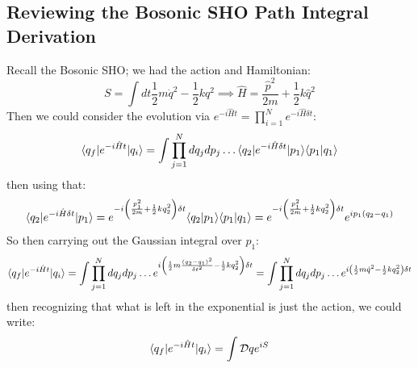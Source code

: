 \subsection{Reviewing the Bosonic SHO Path Integral Derivation}
Recall the Bosonic SHO; we had the action and Hamiltonian:
\begin{equation}
    S = \int dt \frac{1}{2}m\dot{q}^2 - \frac{1}{2}kq^2 \implies \hat{H} = \frac{\hat{p}^2}{2m} + \frac{1}{2}k\hat{q}^2
\end{equation}
Then we could consider the evolution via $e^{-i\hat{H}t} = \prod_{i=1}^N e^{-i\hat{H}\delta t}$:
\begin{equation}
    \langle q_f \rvert e^{-i\hat{H}t}\lvert q_i \rangle = \int \prod_{j=1}^N dq_j dp_j \ldots \langle q_2 \rvert e^{-i\hat{H}\delta t}\lvert p_1 \rangle\langle p_1 \lvert q_1 \rangle
\end{equation}
then using that:
\begin{equation}
    \langle q_2 \rvert e^{-i\hat{H}\delta t}\lvert p_1 \rangle = e^{-i\left(\frac{p_1^2}{2m} + \frac{1}{2}kq_2^2\right)\delta t}\langle q_2 \lvert p_1 \rangle\langle p_1 \lvert q_1 \rangle = e^{-i\left(\frac{p_1^2}{2m} + \frac{1}{2}kq_2^2\right)\delta t}e^{ip_1(q_2 - q_1)}
\end{equation}
So then carrying out the Gaussian integral over $p_1$:
\begin{equation}
    \langle q_f \rvert e^{-i\hat{H}t}\lvert q_i \rangle = \int \prod_{j=1}^N dq_j dp_j \ldots e^{i\left(\frac{1}{2}m\frac{(q_2 - q_1)^2}{\delta t^2} - \frac{1}{2}kq_2^2\right)\delta t} = \int \prod_{j=1}^N dq_j dp_j \ldots e^{i\left(\frac{1}{2}m\dot{q}^2 - \frac{1}{2}kq_2^2\right)\delta t} 
\end{equation}
then recognizing that what is left in the exponential is just the action, we could write:
\begin{equation}
    \langle q_f \rvert e^{-i\hat{H}t}\lvert q_i \rangle = \int \mathcal{D}q e^{iS}
\end{equation}

